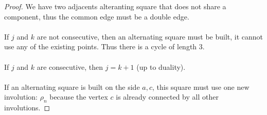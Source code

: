 \begin{proof}
  We have two adjacents alteranting square that does not share a component, thus the common edge must be a double edge.

  \begin{figure}[H]
    \begin{center}
      \caption{}
    \end{center}
  \end{figure}

  \paragraph{}
  If $j$ and $k$ are not consecutive, then an alternating square must be built, it cannot use any of the existing points. Thus there is a cycle of length 3.

  \paragraph{}
  If $j$ and $k$ are consecutive, then $j = k+1$ (up to duality).

  \paragraph{}
  If an alternating square is built on the side $a,c$, this square must use one new involution: $\rho_n$ because the vertex $c$ is already connected by all other involutions.

\end{proof}


